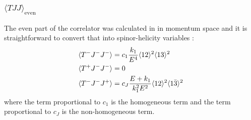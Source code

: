 \documentclass[a4paper,11pt]{article}
\begin{document}
\subsubsection*{{\bf{$\langle TJJ \rangle_{\text{even}}$}}}

The even part of the correlator was calculated in \cite{Bzowski:2013sza,Bzowski:2017poo} in momentum space and it is straightforward to convert that into spinor-helicity variables :
% 
\begin{align}\label{evenTTTso}
    \langle T^- J^- J^- \rangle &= c_1 \frac{k_1}{E^4}\langle 12 \rangle^2 \langle 13 \rangle^2\notag\\
    \langle T^+ J^- J^- \rangle &= 0\notag\\
    \langle T^-J^- J^+ \rangle &= c_J \frac{E+k_1}{k_1^2 E^2}\langle 12 \rangle^2 \langle 1\bar{3}\rangle^2
\end{align}
where the term proportional to $c_1$ is the homogeneous term and the term proportional to $c_J$ is the non-homogeneous term.
\end{document}
